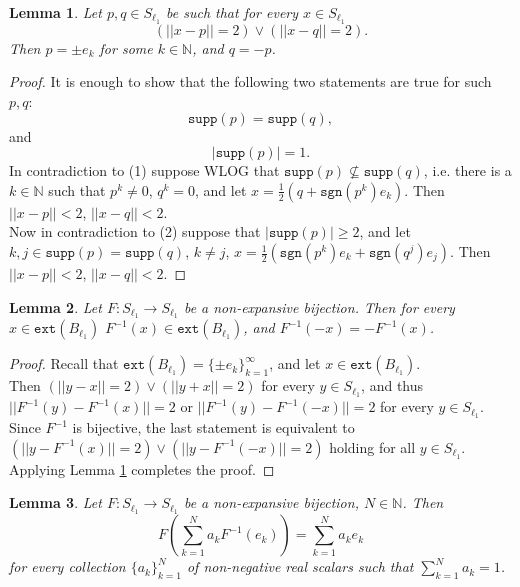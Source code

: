 \documentclass[reqno]{amsart}
\theoremstyle{plain}
\newtheorem{lemma}{Lemma}[section]
\theoremstyle{remark}
\theoremstyle{definition}
\newcommand{\N}{\mathbb N}
\begin{document}
\begin{lemma}\label{l1lem1}
    Let $p,q \in S_{\ell_1}$ be such that for every $x \in S_{\ell_1}$
    \begin{equation*}
        (||x-p||=2)\vee (||x-q||=2).
    \end{equation*}
    Then $p=\pm e_k$ for some $k \in \N$, and $q=-p$.
\end{lemma}

\begin{proof}
    It is enough to show that the following two statements are true for such $p,q$:
    \begin{equation}
        \mathtt{supp}(p)=\mathtt{supp}(q),
    \end{equation}
    and
    \begin{equation}
        |\mathtt{supp}(p)|=1.
    \end{equation}
    In contradiction to (1) suppose WLOG that $\mathtt{supp}(p) \nsubseteq \mathtt{supp}(q)$, i.e. there is a $k \in \N$ such that $p^k \neq 0$, $q^k =0$, and let $x=\frac12(q+\mathtt{sgn}(p^k)e_k)$. Then $||x-p||<2$, $||x-q||<2$.\\
    Now in contradiction to (2) suppose that $|\mathtt{supp}(p)| \geq 2$, and let $k,j \in \mathtt{supp}(p)=\mathtt{supp}(q)$,  $k\neq j$, $x=\frac12(\mathtt{sgn}(p^k)e_k+\mathtt{sgn}(q^j)e_j)$. Then $||x-p||<2$, $||x-q||<2$.
\end{proof}

\begin{lemma}\label{l1lem2}
    Let $F:S_{\ell_1}\rightarrow S_{\ell_1}$ be a non-expansive bijection. Then for every $x \in \mathtt{ext}(B_{\ell_1})$ $F^{-1}(x)\in \mathtt{ext}(B_{\ell_1})$, and $F^{-1}(-x)=-F^{-1}(x)$.
\end{lemma}
\begin{proof}
    Recall that $\mathtt{ext}(B_{\ell_1})=\{\pm e_k\}_{k=1}^\infty$, and let $x \in \mathtt{ext}(B_{\ell_1})$.\\ Then $(||y-x||=2)\vee (||y+x||=2)$ for every $y \in S_{\ell_1}$, and thus $||F^{-1}(y)-F^{-1}(x)||=2$ or $||F^{-1}(y)-F^{-1}(-x)||=2$ for every $y \in S_{\ell_1}$. Since $F^{-1}$ is bijective, the last statement is equivalent to $(||y-F^{-1}(x)||=2)\vee (||y-F^{-1}(-x)||=2)$ holding for all $y \in S_{\ell_1}$. Applying Lemma \ref{l1lem1} completes the proof.
\end{proof}

\begin{lemma}\label{l1lem3}
    Let $F:S_{\ell_1}\rightarrow S_{\ell_1}$ be a non-expansive bijection, $N \in \N$.
    Then 
    \begin{equation}
        F\left(\sum_{k=1}^Na_kF^{-1}(e_k) \right)=\sum_{k=1}^Na_ke_k
    \end{equation}
    for every collection $\{a_k\}_{k=1}^{N}$ of non-negative real scalars such that $\sum_{k=1}^Na_k=1$.
\end{lemma}
\end{document}
